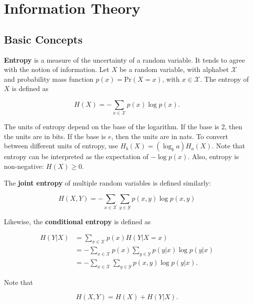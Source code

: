 \chapter{Information Theory}

\section{Basic Concepts}

\textbf{Entropy} is a measure of the uncertainty of a random variable. It tends to agree with the notion of information. Let $X$ be a random variable, with alphabet $\mathcal{X}$ and probability mass function $p(x) = \text{Pr} (X = x)$, with $x \in \mathcal{X}$. The entropy of $X$ is defined as

\begin{equation}
	H(X) = - \sum_{x \in \mathcal{X}} p(x) \log p(x).
	\label{eq: entropy_definition}
\end{equation}

\noindent The units of entropy depend on the base of the logarithm. If the base is 2, then the units are in bits. If the base is $e$, then the units are in nats. To convert between different units of entropy, use $H_b (X) = (\log_b a) H_a (X)$. Note that entropy can be interpreted as the expectation of $-\log p(x)$. Also, entropy is non-negative: $H(X) \geq 0$.

The \textbf{joint entropy} of multiple random variables is defined similarly:

\begin{equation}
	H(X, Y) = - \sum_{x \in \mathcal{X}} \sum_{y \in \mathcal{Y}} p(x, y) \log p(x, y)
	\label{eq: joint_entropy_definition}
\end{equation}

\noindent Likewise, the \textbf{conditional entropy} is defined as

\begin{align*}
	H(Y | X) &= \sum_{x \in \mathcal{X}} p(x) H(Y | X = x) \\
		     &= - \sum_{x \in \mathcal{X}} p(x) \sum_{y \in \mathcal{Y}} p(y | x) \log p(y | x) \\
		     &= - \sum_{x \in \mathcal{X}} \sum_{y \in \mathcal{Y}} p(x, y) \log p(y | x).
	\label{eq: conditional_entropy_definition}
\end{align*}

\noindent Note that

\begin{equation}
	H(X, Y) = H(X) + H(Y | X).
\end{equation}

